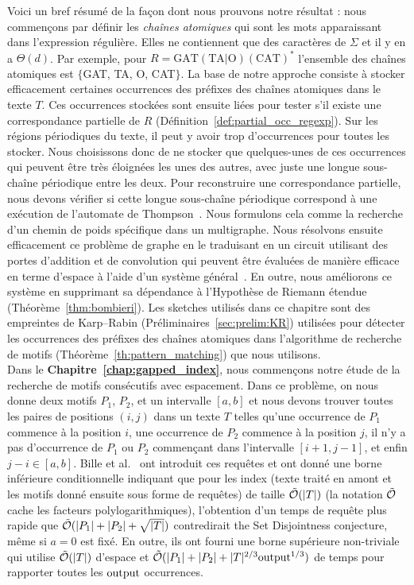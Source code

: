 Voici un bref résumé de la façon dont nous prouvons notre résultat : nous commençons par définir les \emph{chaînes atomiques} qui sont les \og{}mots\fg{}  apparaissant dans l'expression régulière. Elles ne contiennent que des caractères de $\Sigma$ et il y en a $\Theta(d)$. Par exemple, pour $R= \mathrm{GAT}(\mathrm{TA} | \mathrm{O})(\mathrm{CAT})^*$ l'ensemble des chaînes atomiques est $\{$GAT, TA, O, CAT$\}$.
%
La base de notre approche consiste à stocker efficacement certaines occurrences des préfixes des chaînes atomiques dans le texte $T$. Ces occurrences stockées sont ensuite liées pour tester s'il existe une correspondance \og{}partielle\fg{} de $R$ (Définition~\ref*{def:partial_occ_regexp}).
Sur les régions périodiques du texte, il peut y avoir trop d'occurrences pour toutes les stocker.
Nous choisissons donc de ne stocker que quelques-unes de ces occurrences qui peuvent être très éloignées les unes des autres, avec juste une longue sous-chaîne périodique entre les deux. Pour reconstruire une correspondance partielle, nous devons vérifier si cette longue sous-chaîne périodique correspond à une exécution de l'automate de Thompson~\cite{Thompson_automaton}. Nous formulons cela comme la recherche d'un chemin de poids spécifique dans un multigraphe. Nous résolvons ensuite efficacement ce problème de graphe en le traduisant en un circuit utilisant des portes d'addition et de convolution qui peuvent être évaluées de manière efficace en terme d'espace à l'aide d'un système général~\cite{LokshtanovN10,Bringmann17}. En outre, nous améliorons ce système en supprimant sa dépendance à l'Hypothèse de Riemann étendue (Théorème~\ref{thm:bombieri}). 
%
Les sketches utilisés dans ce chapitre sont des empreintes de Karp--Rabin (Préliminaires~\ref{sec:prelim:KR}) utilisées pour détecter les occurrences des préfixes des chaînes atomiques dans l'algorithme de recherche de motifs (Théorème~\ref{th:pattern_matching}) que nous utilisons.\\

Dans le \textbf{Chapitre~\ref{chap:gapped_index}}, nous commençons notre étude de la recherche de motifs consécutifs avec espacement. Dans ce problème, on nous donne deux motifs $P_1$, $P_2$, et un intervalle $[a,b]$ et nous devons trouver toutes les paires de positions $(i,j)$ dans un texte $T$ telles qu'une occurrence de $P_1$ commence à la position $i$, une occurrence de $P_2$ commence à la position $j$, il n'y a pas d'occurrence de $P_1$ ou $P_2$ commençant dans l'intervalle $[i+1,j-1]$, et enfin $j-i \in [a,b]$.
%
Bille et al.~\cite{bille2022gapped} ont introduit ces requêtes et ont donné une borne inférieure conditionnelle indiquant que pour les index (texte traité en amont et les motifs donné ensuite sous forme de requêtes) de taille $\tilde {\mathcal{O}}(|T|)$ (la notation $\tilde {\mathcal{O}}$ cache les facteurs polylogarithmiques), l'obtention d'un temps de requête plus rapide que $\tilde {\mathcal{O}}(|P_1|+|P_2|+\sqrt{|T|})$ contredirait \og{}the Set Disjointness conjecture\fg{}, même si $a=0$ est fixé. En outre, ils ont fourni une borne supérieure non-triviale qui utilise $\tilde {\mathcal{O}}(|T|)$ d'espace et $\tilde {\mathcal{O}} (|P_1| +|P_2| + |T|^{2/3}\mathrm{output}^{1/3})$ de temps pour rapporter toutes les $\mathrm{output}$ occurrences.

